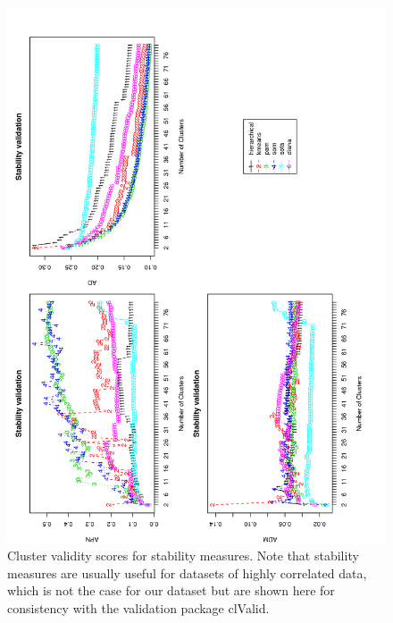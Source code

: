 \begin{figure}
 \centering
\includegraphics[angle=0, scale=0.38]{Chapter2/STval_sta.png}
\caption{Cluster  validity scores  for stability  measures.  Note that
  stability  measures  are  usually  useful  for  datasets  of  highly
  correlated data, which is not the case for our dataset but are shown
  here for consistency with the validation package clValid.}
 \label{fig:stability}
\end{figure}


